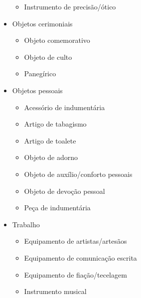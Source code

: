 \begin{itemize}
	\begin{itemize}
		\item Instrumento de precisão/ótico
	\end{itemize}
	\item Objetos cerimoniais
	\begin{itemize}
		\item Objeto comemorativo
		\item Objeto de culto
		\item Panegírico
	\end{itemize}
	\item Objetos pessoais
	\begin{itemize}
		\item Acessório de indumentária
		\item Artigo de tabagismo
		\item Artigo de toalete
		\item Objeto de adorno
		\item Objeto de auxílio/conforto pessoais
		\item Objeto de devoção pessoal
		\item Peça de indumentária
	\end{itemize}
	\item Trabalho
	\begin{itemize}
		\item Equipamento de artistas/artesãos
		\item Equipamento de comunicação escrita
		\item Equipamento de fiação/tecelagem
		\item Instrumento musical
	\end{itemize}
\end{itemize}

